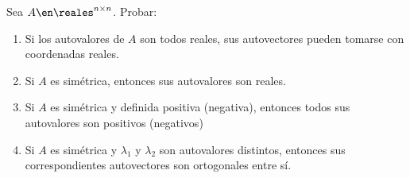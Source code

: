 \begin{enunciado}{\ejercicio}
  Sea $A \en \reales^{n \times n}$. Probar:
  \begin{enumerate}[label=(\alph*)]
    \item Si los autovalores de $A$ son todos reales, sus autovectores pueden tomarse con coordenadas reales.

    \item Si $A$ es simétrica, entonces sus autovalores son reales.

    \item Si $A$ es simétrica y definida positiva (negativa), entonces todos sus autovalores son positivos (negativos)

    \item Si $A$ es simétrica y $\lambda_1$ y $\lambda_2$ son autovalores distintos, entonces sus correspondientes autovectores
          son ortogonales entre sí.
  \end{enumerate}
\end{enunciado}

